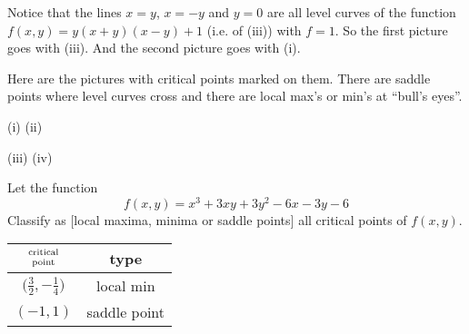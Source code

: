 \begin{solution}
Notice that the lines $x=y$, $x=-y$ and $y=0$ are all level curves
of the function $f(x, y) = y(x + y)(x - y) + 1$ (i.e. of (iii))
with $f=1$. So the first picture goes with (iii). And the second picture
goes with (i).

Here are the pictures with critical points marked on them.
There are saddle points where level curves cross and there
are local max's or min's at ``bull's eyes''.
\begin{center}
(i)   
\quad
(ii)  
\end{center}
\begin{center}
(iii)   
\quad
(iv)   
\end{center}
\end{solution}

\begin{question}[M200 2010D] %
Let the function
\begin{equation*}
f(x,y) = x^3+3xy+3y^2-6x-3y-6
\end{equation*}
Classify as $\big[$local maxima, minima or saddle points$\big]$
all critical points of $f(x,y)$.
\end{question}

%

\begin{answer}
\begin{center}
\renewcommand{\arraystretch}{1.3}
     \begin{tabular}{|c|c|}
     \hline
    $\Atop{\text{critical}}{\text{point}}$   & type \\    
    \hline
     $\big(\frac{3}{2},-\frac{1}{4}\big)$  & local min  \\ \hline
     $(-1,1)$  &  saddle point \\  \hline
     \end{tabular}
\renewcommand{\arraystretch}{1.0}
\end{center}
\end{answer}


